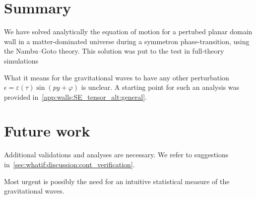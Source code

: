 







\section{Summary}
    We have solved analytically the equation of motion for a pertubed planar domain wall in a matter-dominated universe during a symmetron phase-transition, using the Nambu--Goto theory. This solution was put to the test in full-theory simulations 

    What it means for the gravitational waves to have any other perturbation $\epsilon= \varepsilon(\tau) \sin{(py + \varphi)}$ is unclear. A starting point for such an analysis was provided in~\cref{app:walls:SE_tensor_alt:general}.


\section{Future work}
    Additional validations and analyses are necessary. We refer to suggestions in~\cref{sec:whatif:discussion:cont_verification}. 
    
    Most urgent is possibly the need for an intuitive statistical measure of the gravitational waves. 
    
    



